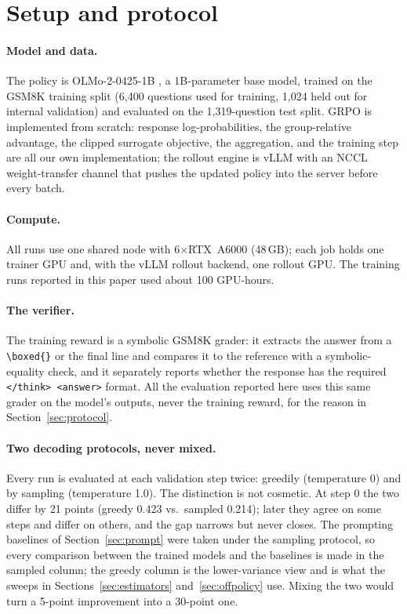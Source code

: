 \documentclass{article}
\begin{document}
\section{Setup and protocol}
\label{sec:setup}

\paragraph{Model and data.} The policy is OLMo-2-0425-1B \citep{groeneveld2024olmo}, a 1B-parameter base model, trained on the GSM8K training split \citep{cobbe2021training} (6{,}400 questions used for training, 1{,}024 held out for internal validation) and evaluated on the 1{,}319-question test split. GRPO is implemented from scratch: response log-probabilities, the group-relative advantage, the clipped surrogate objective, the aggregation, and the training step are all our own implementation; the rollout engine is vLLM with an NCCL weight-transfer channel that pushes the updated policy into the server before every batch.

\paragraph{Compute.} All runs use one shared node with 6$\times$RTX~A6000 (48\,GB); each job holds one trainer GPU and, with the vLLM rollout backend, one rollout GPU. The training runs reported in this paper used about 100 GPU-hours.

\paragraph{The verifier.} The training reward is a symbolic GSM8K grader: it extracts the answer from a \verb|\boxed{}| or the final line and compares it to the reference with a symbolic-equality check, and it separately reports whether the response has the required \verb|</think> <answer>| format. All the evaluation reported here uses this same grader on the model's outputs, never the training reward, for the reason in Section~\ref{sec:protocol}.

\paragraph{Two decoding protocols, never mixed.} Every run is evaluated at each validation step twice: greedily (temperature 0) and by sampling (temperature 1.0). The distinction is not cosmetic. At step 0 the two differ by 21 points (greedy 0.423 vs.\ sampled 0.214); later they agree on some steps and differ on others, and the gap narrows but never closes. The prompting baselines of Section~\ref{sec:prompt} were taken under the sampling protocol, so every comparison between the trained models and the baselines is made in the sampled column; the greedy column is the lower-variance view and is what the sweeps in Sections~\ref{sec:estimators} and~\ref{sec:offpolicy} use. Mixing the two would turn a 5-point improvement into a 30-point one.
\end{document}
